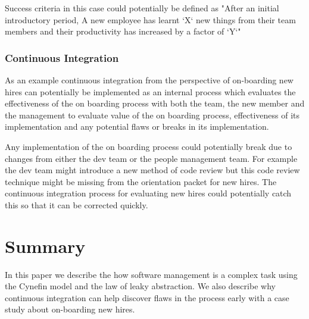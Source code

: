 \documentclass[12pt,conference]{IEEEtran}
\begin{document}
Success criteria in this case could potentially be defined as "After an initial introductory period, A new employee has learnt `X` new things from their team members and their productivity has increased by a factor of `Y`"

\subsubsection*{Continuous Integration}
As an example continuous integration from the perspective of on-boarding new hires can potentially be implemented as an internal process which evaluates the effectiveness of the on boarding process with both the team, the new member and the management to evaluate value of the on boarding process, effectiveness of its implementation and any potential flaws or breaks in its implementation. 

Any implementation of the on boarding process could potentially break due to changes from either the dev team or the people management team. For example the dev team might introduce a new method of code review but this code review technique might be missing from the orientation packet for new hires. The continuous integration process for evaluating new hires could potentially catch this so that it can be corrected quickly.


\section*{Summary}

In this paper we describe the how software management is a complex task using the Cynefin model and the law of leaky abstraction. We also describe why continuous integration can help discover flaws in the process early with a case study about on-boarding new hires.



\end{document}
